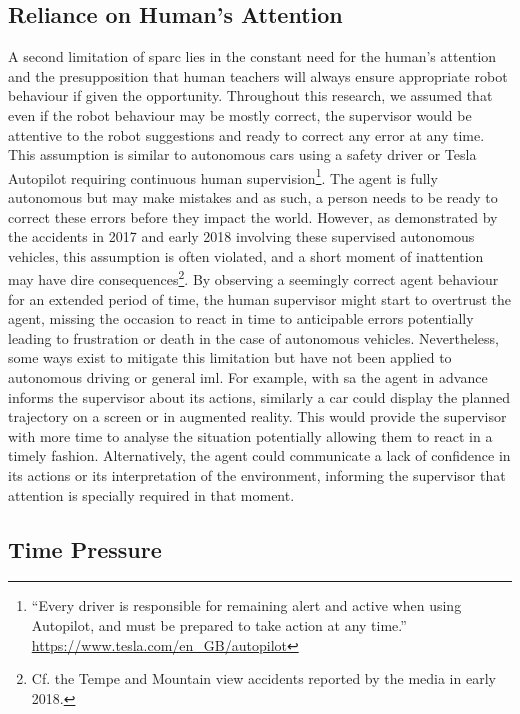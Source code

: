 \subsection{Reliance on Human's Attention}

A second limitation of \gls{sparc} lies in the constant need for the human's attention and the presupposition that human teachers will always ensure  appropriate robot behaviour if given the opportunity. Throughout this research, we assumed that even if the robot behaviour may be mostly correct, the supervisor would be attentive to the robot suggestions and ready to correct any error at any time. This assumption is similar to autonomous cars using a safety driver or Tesla Autopilot requiring continuous human supervision\footnote{``Every driver is responsible for remaining alert and active when using Autopilot, and must be prepared to take action at any time.'' \url{https://www.tesla.com/en_GB/autopilot}}. The agent is fully autonomous but may make mistakes and as such, a person needs to be ready to correct these errors before they impact the world. However, as demonstrated by the accidents in 2017 and early 2018 involving these supervised autonomous vehicles, this assumption is often violated, and a short moment of inattention may have dire consequences\footnote{Cf. the Tempe and Mountain view accidents reported by the media in early 2018.\label{foot:disc_danger}}. By observing a seemingly correct agent behaviour for an extended period of time, the human supervisor might start to overtrust the agent, missing the occasion to react in time to anticipable errors potentially leading to frustration or death in the case of autonomous vehicles. Nevertheless, some ways exist to mitigate this limitation but have not been applied to autonomous driving or general \gls{iml}. For example, with \gls{sa} the agent in advance informs the supervisor about its actions, similarly a car could display the planned trajectory on a screen or in augmented reality. This would provide the supervisor with more time to analyse the situation potentially allowing them to react in a timely fashion. Alternatively, the agent could communicate a lack of confidence in its actions or its interpretation of the environment, informing the supervisor that attention is specially required in that moment.

\subsection{Time Pressure}

